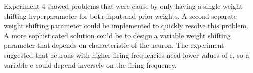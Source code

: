 Experiment 4 showed problems that were cause by only having a single weight shifting hyperparameter for both input and prior weights. A second separate weight shifting parameter could be implemented to quickly resolve this problem. A more sophisticated solution could be to design a variable weight shifting parameter that depends on characteristic of the neuron. The experiment suggested that neurons with higher firing frequencies need lower values of c, so a variable c could depend inversely on the firing frequency.
